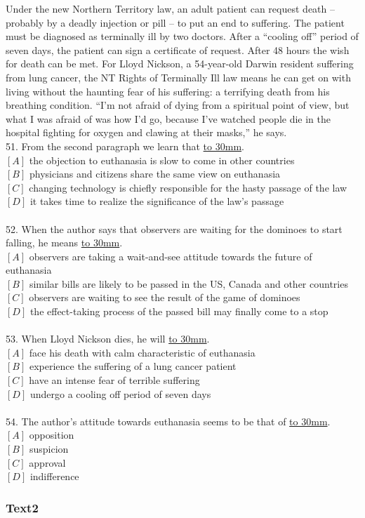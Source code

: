 \documentclass[a4paper]{article}
\begin{document}
\par
Under the new Northern Territory law, an adult patient can request death -- probably by a deadly injection or pill -- to put an end to suffering. The patient must be diagnosed as terminally ill by two doctors. After a “cooling off” period of seven days, the patient can sign a certificate of request. After 48 hours the wish for death can be met. For Lloyd Nickson, a 54-year-old Darwin resident suffering from lung cancer, the NT Rights of Terminally Ill law means he can get on with living without the haunting fear of his suffering: a terrifying death from his breathing condition. “I’m not afraid of dying from a spiritual point of view, but what I was afraid of was how I’d go, because I’ve watched people die in the hospital fighting for oxygen and clawing at their masks,” he says.
\\51.	From the second paragraph we learn that \underline{\hbox to 30mm{}}.\\$[A]$ the objection to euthanasia is slow to come in other countries\\$[B]$ physicians and citizens share the same view on euthanasia\\$[C]$ changing technology is chiefly responsible for the hasty passage of the law\\$[D]$ it takes time to realize the significance of the law’s passage\\\\52.	When the author says that observers are waiting for the dominoes to start falling, he means \underline{\hbox to 30mm{}}.\\$[A]$ observers are taking a wait-and-see attitude towards the future of euthanasia\\$[B]$ similar bills are likely to be passed in the US, Canada and other countries\\$[C]$ observers are waiting to see the result of the game of dominoes\\$[D]$ the effect-taking process of the passed bill may finally come to a stop\\\\53.	When Lloyd Nickson dies, he will \underline{\hbox to 30mm{}}.\\$[A]$ face his death with calm characteristic of euthanasia\\$[B]$ experience the suffering of a lung cancer patient\\$[C]$ have an intense fear of terrible suffering\\$[D]$ undergo a cooling off period of seven days\\\\54.	The author’s attitude towards euthanasia seems to be that of \underline{\hbox to 30mm{}}.\\$[A]$ opposition\\$[B]$ suspicion\\$[C]$ approval\\$[D]$ indifference\\\subsubsection{Text2}
\end{document}
